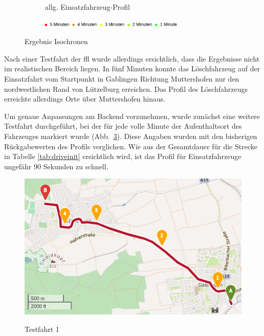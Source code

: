 \begin{figure}[htb]
\begin{subfigure}{0.49\textwidth}
\caption{allg. Einsatzfahrzeug-Profil}
\label{fig:isoeme}
\end{subfigure}
\begin{subfigure}{0.90\textwidth}
\centering
\includegraphics[width = 0.75\textwidth]{../media/legendiso.png} \\
\end{subfigure}
\caption{Ergebnis Isochronen}
\label{fig:isochrones}
\end{figure}

Nach einer Testfahrt der \gls{ffl} wurde allerdings ersichtlich, dass die Ergebnisse nicht im realistischen Bereich liegen.
In fünf Minuten konnte das Löschfahrzeug auf der Einsatzfahrt vom Startpunkt in Gablingen Richtung Muttershofen nur den nordwestlichen Rand von Lützelburg erreichen.
Das Profil des Löschfahrzeugs erreichte allerdings Orte über Muttershofen hinaus.

Um genaue Anpassungen am Backend vorzunehmen, wurde zunächst eine weitere Testfahrt durchgeführt, bei der für jede volle Minute der Aufenthaltsort des Fahrzeuges markiert wurde (Abb.~\ref{fig:drive1}).
Diese Angaben wurden mit den bisherigen Rückgabewerten des Profils verglichen.
Wie aus der Gesamtdauer für die Strecke in Tabelle \ref{tab:driveinit} ersichtlich wird, ist das Profil für Einsatzfahrzeuge ungefähr 90 Sekunden zu schnell.

\begin{figure}[htb]
\centering
\includegraphics[width = 0.7 \textwidth]{../media/Fahrt1.png} \\
\caption{Testfahrt 1}
\label{fig:drive1}
\end{figure}

